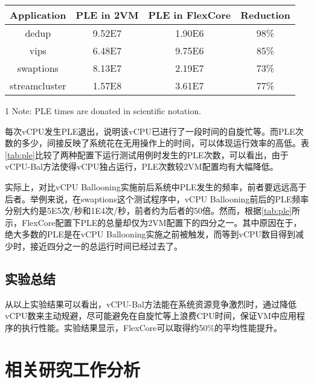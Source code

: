 \begin{table}[!htbp]
\vspace{5mm}
\centering
\begin{threeparttable}
\begin{tabular}{cccc}
\toprule
Application & PLE in 2VM & PLE in FlexCore & Reduction\\
\midrule
  dedup & 9.52E7\tnote{1} & 1.90E6 & 98\%\\
  vips & 6.48E7 & 9.75E6 & 85\%\\
  swaptions & 8.13E7 & 2.19E7 & 73\%\\
  streamcluster & 1.57E8 & 3.61E7 & 77\%\\
\bottomrule
\end{tabular}
\begin{tablenotes}
\footnotesize
\item[1] Note: PLE times are donated in scientific notation.
\end{tablenotes}
\end{threeparttable}
\end{table}

每次vCPU发生PLE退出，说明该vCPU已进行了一段时间的自旋忙等。而PLE次数的多少，间接反映了系统花在无用操作上的时间，可以体现运行效率的高低。表\ref{tab:ple}比较了两种配置下运行测试用例时发生的PLE次数，可以看出，由于vCPU-Bal方法使得vCPU独占运行，PLE次数较2VM配置均有大幅降低。

实际上，对比vCPU Ballooning实施前后系统中PLE发生的频率，前者要远远高于后者。举例来说，在swaptions这个测试程序中，vCPU Ballooning前后的PLE频率分别大约是5E5次/秒和1E4次/秒，前者约为后者的50倍。然而，根据\ref{tab:ple}所示，FlexCore配置下PLE的总量却仅为2VM配置下的四分之一。其中原因在于，绝大多数的PLE是在vCPU Ballooning实施之前被触发，而等到vCPU数目得到减少时，接近四分之一的总运行时间已经过去了。

\subsection{实验总结}

从以上实验结果可以看出，vCPU-Bal方法能在系统资源竞争激烈时，通过降低vCPU数来主动规避，尽可能避免在自旋忙等上浪费CPU时间，保证VM中应用程序的执行性能。实验结果显示，FlexCore可以取得约50\%的平均性能提升。

\section{相关研究工作分析}

